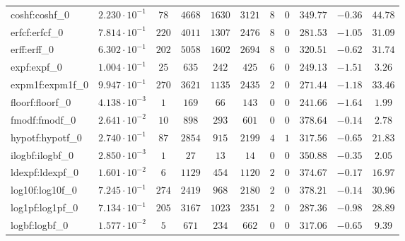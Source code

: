 \begin{tabular}{|l|c|c|c|c|c|c|c|c|c|c|}
coshf:coshf\_0               & $ 2.230 \cdot 10^{-1} $ & $ 78     $ & $ 4668  $ & $ 1630  $ & $ 3121  $ & $ 8   $ & $ 0 $ & $ 349.77      $ & $ -0.36   $ & $ 44.78   $ \\
erfcf:erfcf\_0               & $ 7.814 \cdot 10^{-1} $ & $ 220    $ & $ 4011  $ & $ 1307  $ & $ 2476  $ & $ 8   $ & $ 0 $ & $ 281.53      $ & $ -1.05   $ & $ 31.09   $ \\
erff:erff\_0                 & $ 6.302 \cdot 10^{-1} $ & $ 202    $ & $ 5058  $ & $ 1602  $ & $ 2694  $ & $ 8   $ & $ 0 $ & $ 320.51      $ & $ -0.62   $ & $ 31.74   $ \\
expf:expf\_0                 & $ 1.004 \cdot 10^{-1} $ & $ 25     $ & $ 635   $ & $ 242   $ & $ 425   $ & $ 6   $ & $ 0 $ & $ 249.13      $ & $ -1.51   $ & $ 3.26    $ \\
expm1f:expm1f\_0             & $ 9.947 \cdot 10^{-1} $ & $ 270    $ & $ 3621  $ & $ 1135  $ & $ 2435  $ & $ 2   $ & $ 0 $ & $ 271.44      $ & $ -1.18   $ & $ 33.46   $ \\
floorf:floorf\_0             & $ 4.138 \cdot 10^{-3} $ & $ 1      $ & $ 169   $ & $ 66    $ & $ 143   $ & $ 0   $ & $ 0 $ & $ 241.66      $ & $ -1.64   $ & $ 1.99    $ \\
fmodf:fmodf\_0               & $ 2.641 \cdot 10^{-2} $ & $ 10     $ & $ 898   $ & $ 293   $ & $ 601   $ & $ 0   $ & $ 0 $ & $ 378.64      $ & $ -0.14   $ & $ 2.78    $ \\
hypotf:hypotf\_0             & $ 2.740 \cdot 10^{-1} $ & $ 87     $ & $ 2854  $ & $ 915   $ & $ 2199  $ & $ 4   $ & $ 1 $ & $ 317.56      $ & $ -0.65   $ & $ 21.83   $ \\
ilogbf:ilogbf\_0             & $ 2.850 \cdot 10^{-3} $ & $ 1      $ & $ 27    $ & $ 13    $ & $ 14    $ & $ 0   $ & $ 0 $ & $ 350.88      $ & $ -0.35   $ & $ 2.05    $ \\
ldexpf:ldexpf\_0             & $ 1.601 \cdot 10^{-2} $ & $ 6      $ & $ 1129  $ & $ 454   $ & $ 1120  $ & $ 2   $ & $ 0 $ & $ 374.67      $ & $ -0.17   $ & $ 16.97   $ \\
log10f:log10f\_0             & $ 7.245 \cdot 10^{-1} $ & $ 274    $ & $ 2419  $ & $ 968   $ & $ 2180  $ & $ 2   $ & $ 0 $ & $ 378.21      $ & $ -0.14   $ & $ 30.96   $ \\
log1pf:log1pf\_0             & $ 7.134 \cdot 10^{-1} $ & $ 205    $ & $ 3167  $ & $ 1023  $ & $ 2351  $ & $ 2   $ & $ 0 $ & $ 287.36      $ & $ -0.98   $ & $ 28.89   $ \\
logbf:logbf\_0               & $ 1.577 \cdot 10^{-2} $ & $ 5      $ & $ 671   $ & $ 234   $ & $ 662   $ & $ 0   $ & $ 0 $ & $ 317.06      $ & $ -0.65   $ & $ 9.39    $ \\

\end{tabular}

